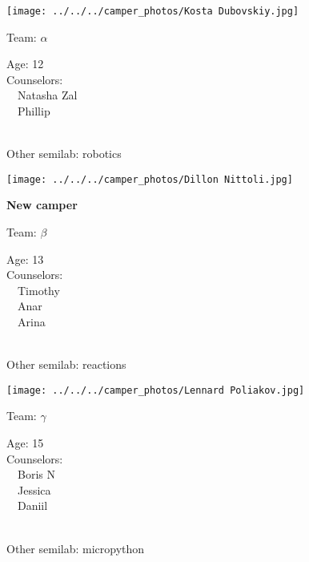 \documentclass[10pt,letterpaper, landscape]{article}
\begin{document}
\verticalshiftfornextsticker
\renewcommand{\baselinestretch}{1} \begin{sticker}
\noindent\begin{minipage}{0.5\textwidth}\texttt{[image: ../../../camper\_photos/Kosta Dubovskiy.jpg]}\end{minipage}\begin{minipage}{0.45\textwidth}
Team: {\Large $\alpha$}

Age:        12\\
Counselors: \\\ \ Natasha Zal\\\ \ Phillip\\
\end{minipage} \\ \vspace{0.07in}
Other semilab: robotics
\end{sticker}
\horizontalshiftfornextsticker
\renewcommand{\baselinestretch}{1} \begin{sticker}
\noindent\begin{minipage}{0.5\textwidth}\texttt{[image: ../../../camper\_photos/Dillon Nittoli.jpg]}\end{minipage}\begin{minipage}{0.45\textwidth}
\textbf{New camper} 

Team: {\Large $\beta$}

Age:        13\\
Counselors: \\\ \ Timothy\\\ \ Anar\\\ \ Arina\\
\end{minipage} \\ \vspace{0.07in}
Other semilab: reactions
\end{sticker}
\horizontalshiftfornextsticker
\renewcommand{\baselinestretch}{1} \begin{sticker}
\noindent\begin{minipage}{0.5\textwidth}\texttt{[image: ../../../camper\_photos/Lennard Poliakov.jpg]}\end{minipage}\begin{minipage}{0.45\textwidth}
Team: {\Large $\gamma$}

Age:        15\\
Counselors: \\\ \ Boris N\\\ \ Jessica\\\ \ Daniil\\
\end{minipage} \\ \vspace{0.07in}
Other semilab: micropython
\end{sticker}
\end{document}
